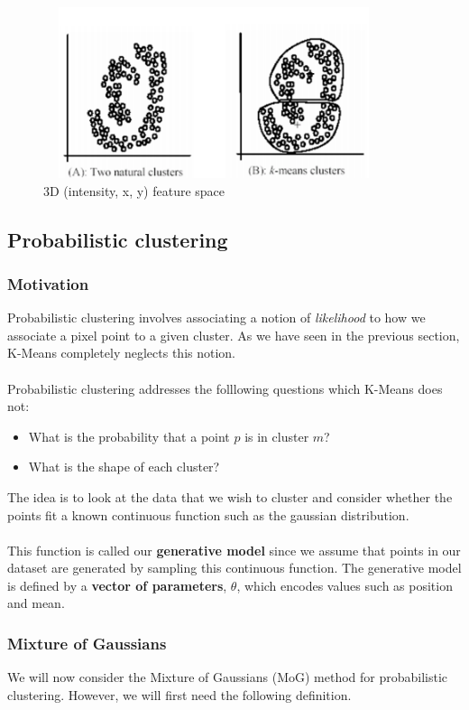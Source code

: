 \documentclass{article}
\begin{document}
\newpage

\begin{figure}[htp]
    \centering
    \includegraphics[width=10cm, height=5cm]{slide_25_2}
    \caption{3D (intensity, x, y) feature space}
    \label{fig:Slide25_2}
\end{figure}

\subsection{Probabilistic clustering}
\subsubsection{Motivation}
Probabilistic clustering involves associating a notion of \textit{likelihood} to how we associate a pixel point to a given cluster. As we have seen in the previous section, K-Means completely neglects this notion.
\\\\
Probabilistic clustering addresses the folllowing questions which K-Means does not:
\begin{itemize}
\item What is the probability that a point $p$ is in cluster $m$?
\item What is the shape of each cluster?
\end{itemize}
The idea is to look at the data that we wish to cluster and consider whether the points fit a known continuous function such as the gaussian distribution. 
\\\\
This function is called our \textbf{generative model} since we assume that points in our dataset are generated by sampling this continuous function. The generative model is defined by a \textbf{vector of parameters}, $\theta$, which encodes values such as position and mean.

\subsubsection{Mixture of Gaussians}
We will now consider the Mixture of Gaussians (MoG) method for probabilistic clustering. However, we will first need the following definition.
\end{document}
